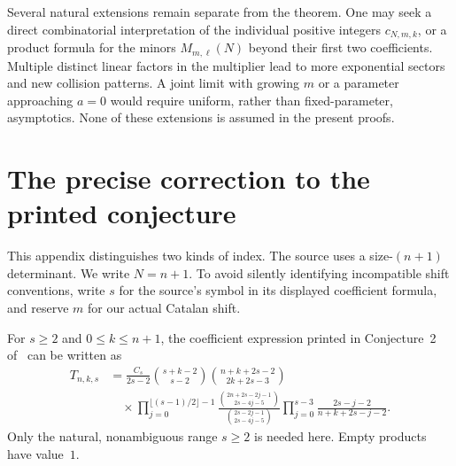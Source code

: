 \documentclass[11pt,a4paper]{article}
\numberwithin{equation}{section}
\theoremstyle{definition}
\theoremstyle{remark}
\begin{document}
Several natural extensions remain separate from the theorem.  One may
seek a direct combinatorial interpretation of the individual positive
integers $c_{N,m,k}$, or a product formula for the minors
$M_{m,\ell}(N)$ beyond their first two coefficients.  Multiple distinct
linear factors in the multiplier lead to more exponential sectors and
new collision patterns.  A joint limit with growing $m$ or a parameter
approaching $a=0$ would require uniform, rather than fixed-parameter,
asymptotics.  None of these extensions is assumed in the present proofs.

\appendix
\section{The precise correction to the printed conjecture}\label{app:barry}

This appendix distinguishes two kinds of index.  The source uses a
size-$(n+1)$ determinant.  We write $N=n+1$.  To avoid silently
identifying incompatible shift conventions, write $s$ for the source's
symbol in its displayed coefficient formula, and reserve $m$ for
our actual Catalan shift.

For $s\geq2$ and $0\leq k\leq n+1$, the coefficient expression printed
in Conjecture~2 of~\cite{Barry2020} can be written as
\begin{align}
 T_{n,k,s}
 &=\frac{C_s}{2s-2}
   \binom{s+k-2}{s-2}\binom{n+k+2s-2}{2k+2s-3}\nonumber\\[-1pt]
 &\quad\times
  \prod_{j=0}^{\lfloor(s-1)/2\rfloor-1}
       \frac{\binom{2n+2s-2j-1}{2s-4j-5}}
            {\binom{2s-2j-1}{2s-4j-5}}
  \prod_{j=0}^{s-3}\frac{2s-j-2}{n+k+2s-j-2}.
 \label{eq:BarryT}
\end{align}
Only the natural, nonambiguous range $s\geq2$ is needed here.  Empty
products have value~$1$.
\end{document}
